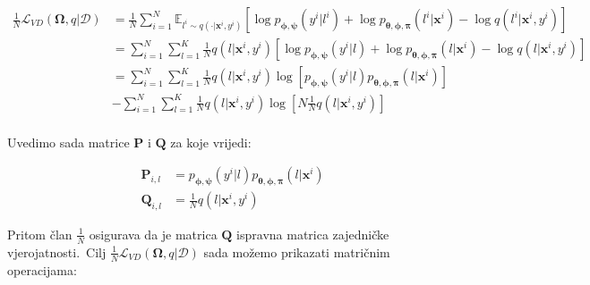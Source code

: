 \documentclass[diplomskirad]{fer}
\begin{document}
\begin{equation}
  \begin{aligned}
    \frac{1}{N} \mathcal{L}_{VD}(\bm{\Omega}, q | \mathcal{D}) &= \frac{1}{N} \sum_{i=1}^{N} \mathbb{E}_{l^i \sim q(\cdot | \bm{x}^i, y^i)} \left[\log p_{\bm{\phi}, \bm{\psi}}(y^i | l^i) + \log p_{\bm{\theta}, \bm{\phi}, \bm{\pi}}(l^i | \bm{x}^i) - \log q(l^i | \bm{x}^i, y^i) \right] \\
                                                               &= \sum_{i=1}^{N} \sum_{l=1}^{K} \frac{1}{N} q(l | \bm{x}^i, y^i) \left[\log p_{\bm{\phi}, \bm{\psi}}(y^i | l) + \log p_{\bm{\theta}, \bm{\phi}, \bm{\pi}}(l | \bm{x}^i) - \log q(l | \bm{x}^i, y^i) \right] \\ 
                                                               &= \sum_{i=1}^{N} \sum_{l=1}^{K} \frac{1}{N} q(l | \bm{x}^i, y^i) \log \left[p_{\bm{\phi}, \bm{\psi}}(y^i | l) p_{\bm{\theta}, \bm{\phi}, \bm{\pi}}(l | \bm{x}^i) \right] \\ 
                                                               &- \sum_{i=1}^{N} \sum_{l=1}^{K} \frac{1}{N} q(l | \bm{x}^i, y^i) \log \left[N \frac{1}{N} q(l | \bm{x}^i, y^i) \right] \\ 
  \end{aligned}
  \label{eq:vibe_e_step_init}
\end{equation}

Uvedimo sada matrice $\bm{P}$ i $\bm{Q}$ za koje vrijedi:

\begin{equation}
  \begin{aligned}
    \bm{P}_{i, l} &= p_{\bm{\phi}, \bm{\psi}}(y^i | l) p_{\bm{\theta}, \bm{\phi}, \bm{\pi}}(l | \bm{x}^i) \\
    \bm{Q}_{i, l} &= \frac{1}{N} q(l | \bm{x}^i, y^i)
  \end{aligned}
  \label{eq:vibe_matrices_p_q}
\end{equation}

Pritom član $\frac{1}{N}$ osigurava da je matrica $\bm{Q}$ ispravna matrica zajedničke vjerojatnosti.\ Cilj $\frac{1}{N} \mathcal{L}_{VD}(\bm{\Omega}, q | \mathcal{D})$ sada možemo prikazati matričnim operacijama:
\end{document}
